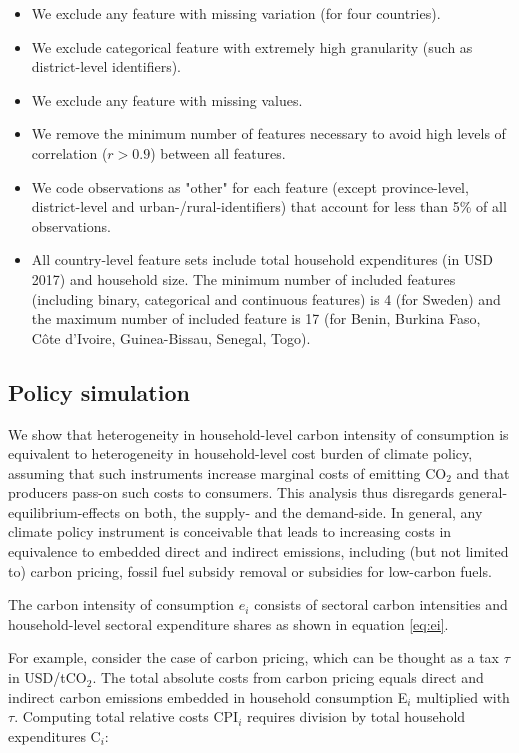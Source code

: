 \documentclass[12pt, a4paper]{article}
\begin{document}
\begin{refsection}
\begin{itemize}
    \item We exclude any feature with missing variation (for four countries).
    \item We exclude categorical feature with extremely high granularity (such as district-level identifiers).
    \item We exclude any feature with missing values.
    \item We remove the minimum number of features necessary to avoid high levels of correlation ($r>0.9$) between all features.
    \item We code observations as "other" for each feature (except province-level, district-level and urban-/rural-identifiers) that account for less than 5\% of all observations.
    \item All country-level feature sets include total household expenditures (in USD 2017) and household size. The minimum number of included features (including binary, categorical and continuous features) is 4 (for Sweden) and the maximum number of included feature is 17 (for Benin, Burkina Faso, Côte d'Ivoire, Guinea-Bissau, Senegal, Togo).
\end{itemize}

\subsection{Policy simulation}\label{sec:policysimulation}

We show that heterogeneity in household-level carbon intensity of consumption is equivalent to heterogeneity in household-level cost burden of climate policy, assuming that such instruments increase marginal costs of emitting CO$_{2}$ and that producers pass-on such costs to consumers. This analysis thus disregards general-equilibrium-effects on both, the supply- and the demand-side. In general, any climate policy instrument is conceivable that leads to increasing costs in equivalence to embedded direct and indirect emissions, including (but not limited to) carbon pricing, fossil fuel subsidy removal or subsidies for low-carbon fuels.

The carbon intensity of consumption $e_{i}$ consists of sectoral carbon intensities and household-level sectoral expenditure shares as shown in equation \ref{eq:ei}. 

For example, consider the case of carbon pricing, which can be thought as a tax $\tau$ in USD/tCO$_{2}$. The total absolute costs from carbon pricing equals direct and indirect carbon emissions embedded in household consumption E$_{i}$ multiplied with $\tau$. Computing total relative costs CPI$_{i}$ requires division by total household expenditures C$_{i}$:


\end{refsection}
\end{document}
